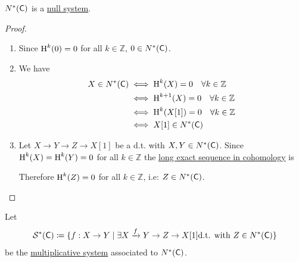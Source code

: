 \documentclass[../../main]{subfiles}
\begin{document}
\begin{lemma}
  \(N^{\ast}(\mathsf{C})\) is a \hyperref[def:null-system]{null system}.
\end{lemma}
\begin{proof}~
  \begin{enumerate}
    \item[N.1] Since \(\operatorname{H}^{k}(0) = 0\) for all \(k \in \mathbb{Z}\), \(0 \in N^{\ast}(\mathsf{C})\).
    \item[N.2] We have
          \begin{align*}
            X \in N^{\ast}(\mathsf{C}) &\iff \operatorname{H}^{k}(X) = 0 \quad \forall k \in \mathbb{Z} \\
                                    &\iff \operatorname{H}^{k+1}(X) = 0 \quad \forall k \in \mathbb{Z} \\
                                    &\iff \operatorname{H}^{k}(X[1]) = 0 \quad \forall k \in \mathbb{Z} \\
                                    &\iff X[1] \in N^{\ast}(\mathsf{C})
          \end{align*}
    \item[N.3] Let \(X \to Y \to Z \to X[1]\) be a d.t. with \(X, Y \in N^{\ast}(\mathsf{C})\).
          Since \(\operatorname{H}^{k}(X) = \operatorname{H}^{k}(Y) = 0\) for all \(k \in \mathbb{Z}\) the \hyperref[thm:LES-in-cohomology]{long exact sequence in cohomology} is
          \begin{center}
          \end{center}
          Therefore \(\operatorname{H}^{k}(Z) = 0\) for all \(k \in \mathbb{Z}\), i.e: \(Z \in N^{\ast}(\mathsf{C})\).
  \end{enumerate}
\end{proof}

Let
\begin{equation*}
  \mathcal{S}^{\ast}(\mathsf{C}) \coloneq \{ f: X \to Y \mid \exists X \xrightarrow{f} Y \to Z \to X[1] \text{d.t. with } Z \in N^{\ast}(\mathsf{C}) \}
\end{equation*}
be the \hyperref[def:multiplicative-system]{multiplicative system} associated to \(N^{\ast}(\mathsf{C})\).
\end{document}
